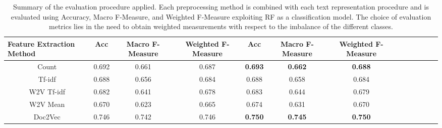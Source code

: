 \documentclass[10pt]{article}
\begin{document}
\begin{table}[]
{\begin{tabular}{ccccccccccccc}
\multicolumn{1}{l}{Feature Extraction Method} & Acc   & Macro F-Measure & Weighted F-Measure & Acc    & Macro F-Measure & Weighted F-Measure \\ \hline
Count   & 0.692 & 0.661           & 0.687              & \textbf{0.693}   & \textbf{0.662}             & \textbf{0.688}                \\
Tf-idf                & 0.688 & 0.656           & 0.684              & 0.688   & 0.658             & 0.684                \\
W2V Tf-idf                  & 0.682 & 0.641           & 0.678              & 0.683   & 0.644             & 0.679                \\
W2V Mean                & 0.670  & 0.623           & 0.665              & 0.674   & 0.631             & 0.670                 \\
Doc2Vec                                                     & 0.746 & 0.742           & 0.746              & \textbf{0.750}    & \textbf{0.745}             & \textbf{0.750}                 \\ \hline
\end{tabular}
}
\caption{Summary of the evaluation procedure applied. Each preprocessing method is combined with each text representation procedure and is evaluated using Accuracy, Macro F-Measure, and Weighted F-Measure exploiting RF as a classification model. The choice of evaluation metrics lies in the need to obtain weighted measurements with respect to the imbalance of the different classes.}
\label{tab:evaluations}
\end{table}
\end{document}
